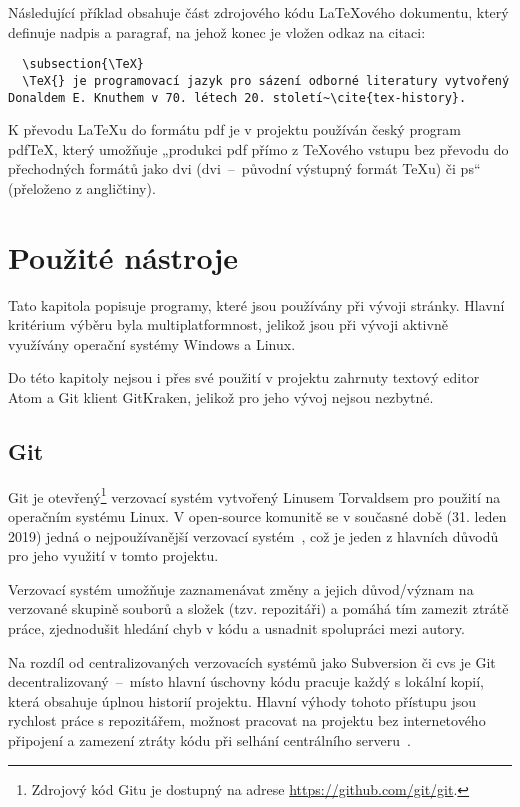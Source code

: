 \documentclass[a4paper, 12pt]{article}
\begin{document}
  Následující příklad obsahuje část zdrojového kódu \LaTeX ového dokumentu, který definuje nadpis a paragraf, na jehož konec je vložen odkaz na citaci:

  \begin{verbatim}
  \subsection{\TeX}
  \TeX{} je programovací jazyk pro sázení odborné literatury vytvořený Donaldem E. Knuthem v 70. létech 20. století~\cite{tex-history}.
  \end{verbatim}

  K převodu \LaTeX u do formátu \gls{pdf} je v projektu používán český program pdf\TeX, který umožňuje „produkci \gls{pdf} přímo z \TeX ového vstupu bez převodu do přechodných formátů jako \acrshort{dvi} (\acrlong{dvi}~--~původní výstupný formát \TeX u) či \gls{ps}“~\cite{pdftex} (přeloženo z angličtiny).


  \section{Použité nástroje} \label{sec:Použité nástroje}
  Tato kapitola popisuje programy, které jsou používány při vývoji stránky. Hlavní kritérium výběru byla multiplatformnost, jelikož jsou při vývoji aktivně využívány operační systémy Windows a Linux.

  Do této kapitoly nejsou i přes své použití v projektu zahrnuty textový editor Atom a Git klient GitKraken, jelikož pro jeho vývoj nejsou nezbytné.


  \subsection{Git} \label{sec:Git}
  Git je otevřený\footnote{Zdrojový kód Gitu je dostupný na adrese \url{https://github.com/git/git}.} verzovací systém vytvořený Linusem Torvaldsem pro použití na operačním systému Linux. V open-source komunitě se v současné době (31. leden 2019) jedná o nejpoužívanější verzovací systém~\cite{version-control-usage-statistics}, což je jeden z hlavních důvodů pro jeho využití v tomto projektu.

  Verzovací systém umožňuje zaznamenávat změny a jejich důvod/význam na verzované skupině souborů a složek (tzv. repozitáři) a pomáhá tím zamezit ztrátě práce, zjednodušit hledání chyb v kódu a usnadnit spolupráci mezi autory.

  Na rozdíl od centralizovaných verzovacích systémů jako Subversion či \gls{cvs} je Git decentralizovaný~--~místo hlavní úschovny kódu pracuje každý s lokální kopií, která obsahuje úplnou historií projektu. Hlavní výhody tohoto přístupu jsou rychlost práce s repozitářem, možnost pracovat na projektu bez internetového připojení a zamezení ztráty kódu při selhání centrálního serveru~\cite{cvcs-vs-dvcs}.
\end{document}
